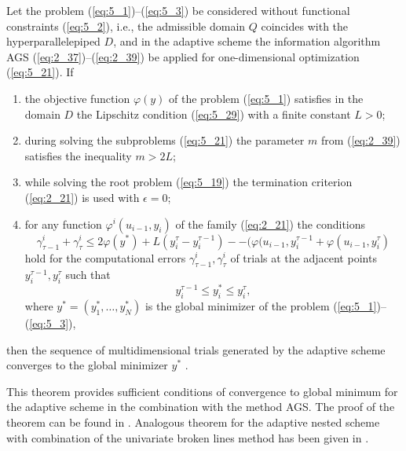 \begin{theorem}
\label{theor:5_2}
Let the problem (\ref{eq:5_1})--(\ref{eq:5_3}) be considered without functional constraints (\ref{eq:5_2}), i.e., the admissible domain $Q$ coincides with the hyperparallelepiped $D$, and in the adaptive scheme  the information algorithm AGS (\ref{eq:2_37})--(\ref{eq:2_39}) be applied for one-dimensional optimization (\ref{eq:5_21}). If
\begin{enumerate}
\item {the objective function $\varphi(y)$  of the problem (\ref{eq:5_1}) satisfies in the domain $D$  the Lipschitz condition (\ref{eq:5_29}) with a finite constant $L>0$;}
\item {during solving the subproblems (\ref{eq:5_21}) the parameter $m$ from (\ref{eq:2_39}) satisfies the inequality $m>2L$;}
\item {while solving the root problem (\ref{eq:5_19}) the termination criterion (\ref{eq:2_21}) is used with $\epsilon=0$;}
\item {for any function $\varphi^i(u_{i-1},y_i)$  of the family (\ref{eq:2_21}) the conditions 
\begin{equation}
\label{eq:5_35}
\gamma_{\tau-1}^i+\gamma_\tau^i\leq 2\varphi(y^*)+L(y_i^\tau-y_i^{\tau-1})--(\varphi(u_{i-1},y_i^{\tau-1}+\varphi(u_{i-1},y_i^\tau)
\end{equation}
hold for the computational errors $\gamma_{\tau-1}^i,\gamma_\tau^i$  of trials at the adjacent points $ y_i^{\tau-1},y_i^\tau$ such that
\begin{displaymath}
y_i^{\tau-1}\leq y_i^*\leq y_i^\tau,
\end{displaymath}
where $y^*=(y_1^*,\ldots,y_N^*)$  is the global minimizer of the problem (\ref{eq:5_1})--(\ref{eq:5_3}),}
\end{enumerate}
then the sequence of multidimensional trials generated by the adaptive scheme converges to the global minimizer $y^*$ .
\end{theorem}

This theorem provides sufficient conditions of convergence to global minimum for the adaptive scheme in the combination with the method AGS. The proof of the theorem can be found in \cite{5_GerGriGer}. Analogous theorem for the adaptive nested scheme with combination of the univariate broken lines method \cite{5_Piyavskij} has been given in \cite{5_GriIsrSergAMC}.
